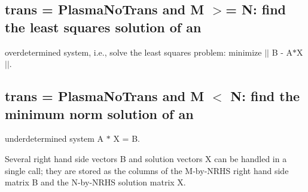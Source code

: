 \subsection*{trans = Plasma\+No\+Trans and M $>$= N\+: find the least squares solution of an}

overdetermined system, i.\+e., solve the least squares problem\+: minimize $\vert$$\vert$ B -\/ A$\ast$\+X $\vert$$\vert$.

\subsection*{trans = Plasma\+No\+Trans and M $<$ N\+: find the minimum norm solution of an}

underdetermined system A $\ast$ X = B.

Several right hand side vectors B and solution vectors X can be handled in a single call; they are stored as the columns of the M-\/by-\/\+N\+R\+H\+S right hand side matrix B and the N-\/by-\/\+N\+R\+H\+S solution matrix X.


